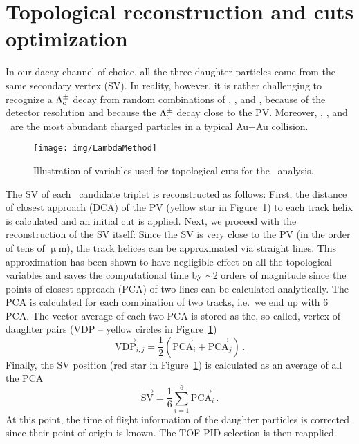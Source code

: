 \section{Topological reconstruction and cuts optimization}

In our dacay channel of choice, all the three daughter particles come from the same secondary vertex (SV)\@. In reality, however, it is rather challenging to recognize a $\Lambda_\text{c}^\pm$ decay from random combinations of \pipm, \Kmp, and \ppm, because of the detector resolution and because the $\Lambda_\text{c}^\pm$ decay close to the PV\@. Moreover, \pipm, \Kmp, and \ppm\ are the most abundant charged particles in a typical Au+Au collision.

\begin{figure}[!htb]
\centering
\texttt{[image: img/LambdaMethod]}
\caption{\label{fig:method}Illustration of variables used for topological cuts for the \Lambdac\ analysis.}
\end{figure}

The SV of each \Lambdac\ candidate triplet is reconstructed as follows: First, the distance of closest approach (DCA) of the PV (yellow star in Figure~\ref{fig:method}) to each track helix is calculated and an initial cut is applied. Next, we proceed with the reconstruction of the SV itself\@: Since the SV is very close to the PV (in the order of tens of $\upmu$m), the track helices can be approximated via straight lines. This approximation has been shown to have negligible effect on all the topological variables and saves the computational time by $\sim$2 orders of magnitude since the points of closest approach (PCA) of two lines can be calculated analytically. The PCA is calculated for each combination of two tracks, i.e.\ we end up with 6 PCA\@. The vector average of each two PCA is stored as the, so called, vertex of daughter pairs (VDP -- yellow circles in Figure~\ref{fig:method})
\begin{equation}
\overrightarrow{\mathrm{VDP}}_{i,j} = \frac{1}{2} \left( \overrightarrow{\mathrm{PCA}}_i + \overrightarrow{\mathrm{PCA}}_j \right)\,. 
\end{equation}
Finally, the SV position (red star in Figure~\ref{fig:method}) is calculated as an average of all the PCA
\begin{equation}
\overrightarrow{\mathrm{SV}}=\frac{1}{6}\sum_{i=1}^6 \overrightarrow{\mathrm{PCA}}_i \,.
\end{equation}
At this point, the time of flight information of the daughter particles is corrected since their point of origin is known. The TOF PID selection is then reapplied.


